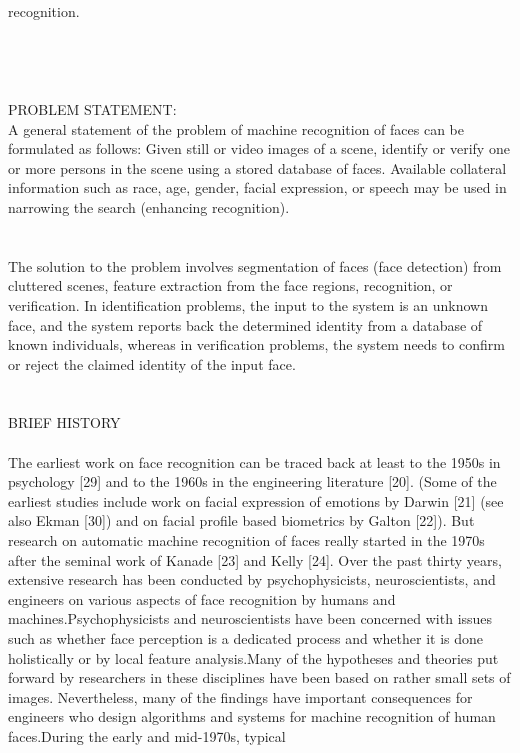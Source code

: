 \documentclass[12pt,a4paper]{book}
\begin{document}
recognition.\\ \\
\\ \\ \\
PROBLEM STATEMENT: \\
A general statement of the problem of machine recognition of faces can be formulated
as follows: Given still or video images of a scene, identify or verify one
or more persons in the scene using a stored database of faces. Available collateral
information such as race, age, gender, facial expression, or speech may be
used in narrowing the search (enhancing recognition).
\\ \\ \\
The solution to the problem
involves segmentation of faces (face detection) from cluttered scenes, feature
extraction from the face regions, recognition, or verification. In identification problems, the input
to the system is an unknown face, and the system reports back the determined
identity from a database of known individuals, whereas in verification problems,
the system needs to confirm or reject the claimed identity of the input face.
\\ \\ \\
BRIEF HISTORY\\ \\
The earliest work on face recognition can be traced back at least to the 1950s
in psychology [29] and to the 1960s in the engineering literature [20]. (Some of
the earliest studies include work on facial expression of emotions by Darwin [21]
(see also Ekman [30]) and on facial profile based biometrics by Galton [22]). But
research on automatic machine recognition of faces really started in the 1970s
after the seminal work of Kanade [23] and Kelly [24]. Over the past thirty years,
extensive research has been conducted by psychophysicists, neuroscientists, and
engineers on various aspects of face recognition by humans and machines.Psychophysicists and neuroscientists have been concerned with issues such as
whether face perception is a dedicated process and whether it is done holistically or by
local feature analysis.Many of the hypotheses and
theories put forward by researchers in these disciplines have been based on rather
small sets of images. Nevertheless, many of the findings have important consequences
for engineers who design algorithms and systems for machine recognition of human faces.During the early and mid-1970s, typical
\end{document}
